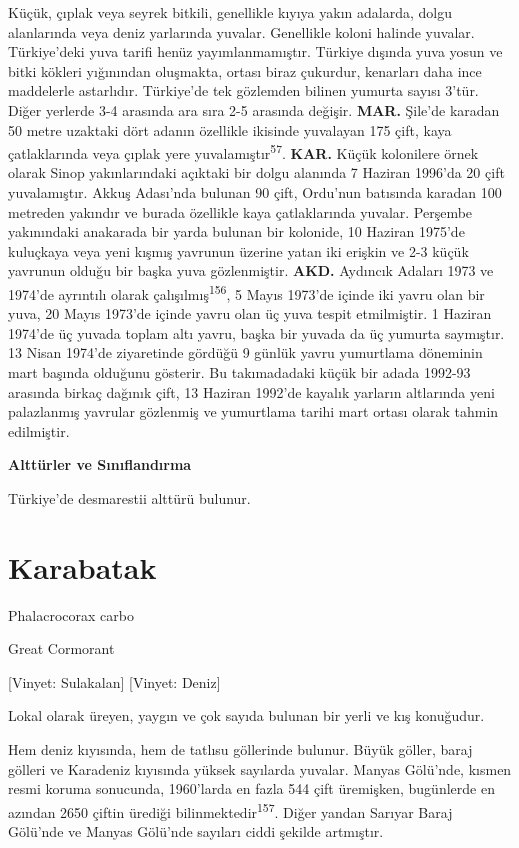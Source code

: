 \documentclass[
  letterpaper,
  DIV=11,
  numbers=noendperiod]{scrreprt}
\begin{document}
Küçük, çıplak veya seyrek bitkili, genellikle kıyıya yakın adalarda,
dolgu alanlarında veya deniz yarlarında yuvalar. Genellikle koloni
halinde yuvalar. Türkiye'deki yuva tarifi henüz yayımlanmamıştır.
Türkiye dışında yuva yosun ve bitki kökleri yığınından oluşmakta, ortası
biraz çukurdur, kenarları daha ince maddelerle astarlıdır. Türkiye'de
tek gözlemden bilinen yumurta sayısı 3'tür. Diğer yerlerde 3-4 arasında
ara sıra 2-5 arasında değişir. \textbf{MAR.} Şile'de karadan 50 metre
uzaktaki dört adanın özellikle ikisinde yuvalayan 175 çift, kaya
çatlaklarında veya çıplak yere yuvalamıştır\textsuperscript{57}.
\textbf{KAR.} Küçük kolonilere örnek olarak Sinop yakınlarındaki
açıktaki bir dolgu alanında 7 Haziran 1996'da 20 çift yuvalamıştır.
Akkuş Adası'nda bulunan 90 çift, Ordu'nun batısında karadan 100 metreden
yakındır ve burada özellikle kaya çatlaklarında yuvalar. Perşembe
yakınındaki anakarada bir yarda bulunan bir kolonide, 10 Haziran 1975'de
kuluçkaya veya yeni kışmış yavrunun üzerine yatan iki erişkin ve 2-3
küçük yavrunun olduğu bir başka yuva gözlenmiştir. \textbf{AKD.}
Aydıncık Adaları 1973 ve 1974'de ayrıntılı olarak
çalışılmış\textsuperscript{156}, 5 Mayıs 1973'de içinde iki yavru olan
bir yuva, 20 Mayıs 1973'de içinde yavru olan üç yuva tespit etmilmiştir.
1 Haziran 1974'de üç yuvada toplam altı yavru, başka bir yuvada da üç
yumurta saymıştır. 13 Nisan 1974'de ziyaretinde gördüğü 9 günlük yavru
yumurtlama döneminin mart başında olduğunu gösterir. Bu takımadadaki
küçük bir adada 1992-93 arasında birkaç dağınık çift, 13 Haziran 1992'de
kayalık yarların altlarında yeni palazlanmış yavrular gözlenmiş ve
yumurtlama tarihi mart ortası olarak tahmin edilmiştir.

\textbf{Alttürler ve Sınıflandırma}

Türkiye'de desmarestii alttürü bulunur.

\section{Karabatak}\label{karabatak}

Phalacrocorax carbo

Great Cormorant

{[}Vinyet: Sulakalan{]} {[}Vinyet: Deniz{]}

Lokal olarak üreyen, yaygın ve çok sayıda bulunan bir yerli ve kış
konuğudur.

Hem deniz kıyısında, hem de tatlısu göllerinde bulunur. Büyük göller,
baraj gölleri ve Karadeniz kıyısında yüksek sayılarda yuvalar. Manyas
Gölü'nde, kısmen resmi koruma sonucunda, 1960'larda en fazla 544 çift
üremişken, bugünlerde en azından 2650 çiftin ürediği
bilinmektedir\textsuperscript{157}. Diğer yandan Sarıyar Baraj Gölü'nde
ve Manyas Gölü'nde sayıları ciddi şekilde artmıştır.
\end{document}
